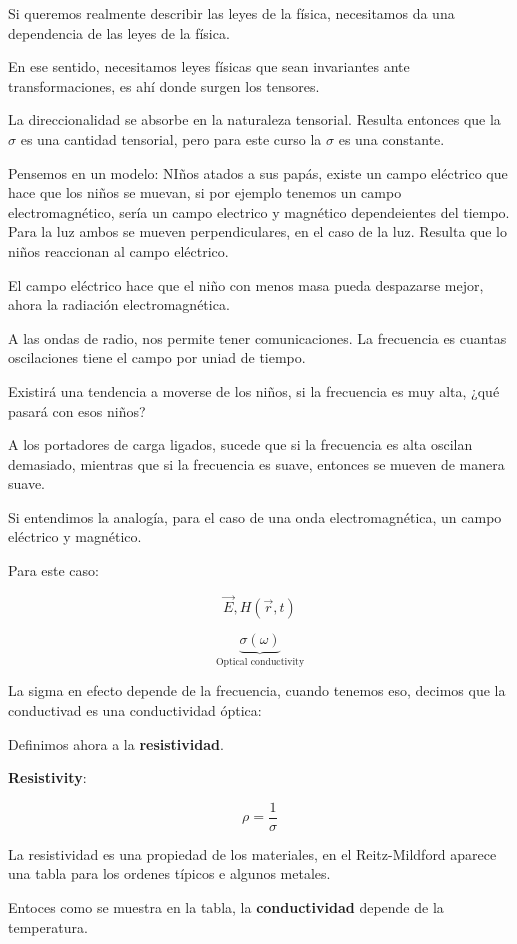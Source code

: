 \documentclass{article}
\begin{document}
Si queremos realmente describir las leyes de la física, necesitamos da una dependencia de las leyes de la física. 

En ese sentido, necesitamos leyes físicas que sean invariantes ante transformaciones, es ahí donde surgen los tensores.

La direccionalidad se absorbe en la naturaleza tensorial. Resulta entonces que la $\sigma$ es una cantidad tensorial, pero para este curso la $\sigma$ es una constante. 


Pensemos en un modelo: NIños atados a sus papás, existe un campo eléctrico que hace que los niños se muevan, si por ejemplo tenemos un campo electromagnético, sería un campo electrico y magnético dependeientes del tiempo. Para la luz ambos se mueven perpendiculares, en el caso de la luz. Resulta que lo niños reaccionan al campo eléctrico. 


El campo eléctrico hace que el niño con menos masa pueda despazarse mejor, ahora la radiación electromagnética. 


A las ondas de radio, nos permite tener comunicaciones. La frecuencia es cuantas oscilaciones tiene el campo por uniad de tiempo.


Existirá una tendencia a moverse de los niños, si la frecuencia es muy alta, ¿qué pasará con esos niños? 


A los portadores de carga ligados, sucede que si la frecuencia es alta oscilan demasiado, mientras que si la frecuencia es suave, entonces se mueven de manera suave. 


Si entendimos la analogía, para el caso de una onda electromagnética, un campo eléctrico y magnético.


Para este caso:


\[ \vec{E}, H(\vec{r},t) \]


\[ \underbrace{\sigma(\omega)}_{\text{Optical conductivity}} \]

La sigma en efecto depende de la frecuencia, cuando tenemos eso, decimos que la conductivad es una conductividad óptica:


Definimos ahora a la \textbf{resistividad}.


\textbf{Resistivity}:


\[  \rho = \frac{1}{\sigma}  \]

La resistividad es una propiedad de los materiales, en el Reitz-Mildford aparece una tabla para los ordenes típicos e algunos metales. 


Entoces como se muestra en la tabla, la \textbf{conductividad} depende de la temperatura.
\end{document}
